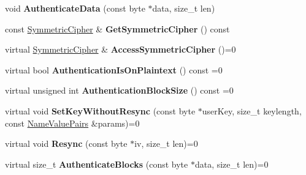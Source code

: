 \begin{DoxyCompactItemize}
\item 
\hypertarget{class_authenticated_symmetric_cipher_base_a7301940acbeb15766869f0cd34d38ccc}{
void {\bfseries AuthenticateData} (const byte $\ast$data, size\_\-t len)}
\label{class_authenticated_symmetric_cipher_base_a7301940acbeb15766869f0cd34d38ccc}

\item 
\hypertarget{class_authenticated_symmetric_cipher_base_afbb278c9474c59cb2432230d51808e1d}{
const \hyperlink{class_symmetric_cipher}{SymmetricCipher} \& {\bfseries GetSymmetricCipher} () const }
\label{class_authenticated_symmetric_cipher_base_afbb278c9474c59cb2432230d51808e1d}

\item 
\hypertarget{class_authenticated_symmetric_cipher_base_a3ce66816441895342dc3a7ca9f40fbb8}{
virtual \hyperlink{class_symmetric_cipher}{SymmetricCipher} \& {\bfseries AccessSymmetricCipher} ()=0}
\label{class_authenticated_symmetric_cipher_base_a3ce66816441895342dc3a7ca9f40fbb8}

\item 
\hypertarget{class_authenticated_symmetric_cipher_base_a6f73519e6de98c487592e89df1673f30}{
virtual bool {\bfseries AuthenticationIsOnPlaintext} () const =0}
\label{class_authenticated_symmetric_cipher_base_a6f73519e6de98c487592e89df1673f30}

\item 
\hypertarget{class_authenticated_symmetric_cipher_base_a22214f198aa9cd58878eb1ba72698091}{
virtual unsigned int {\bfseries AuthenticationBlockSize} () const =0}
\label{class_authenticated_symmetric_cipher_base_a22214f198aa9cd58878eb1ba72698091}

\item 
\hypertarget{class_authenticated_symmetric_cipher_base_aa4bf2de3e27ecb93fac981ea84b64cbe}{
virtual void {\bfseries SetKeyWithoutResync} (const byte $\ast$userKey, size\_\-t keylength, const \hyperlink{class_name_value_pairs}{NameValuePairs} \&params)=0}
\label{class_authenticated_symmetric_cipher_base_aa4bf2de3e27ecb93fac981ea84b64cbe}

\item 
\hypertarget{class_authenticated_symmetric_cipher_base_a20221bcfa8c65825968ada3f4b7df8d6}{
virtual void {\bfseries Resync} (const byte $\ast$iv, size\_\-t len)=0}
\label{class_authenticated_symmetric_cipher_base_a20221bcfa8c65825968ada3f4b7df8d6}

\item 
\hypertarget{class_authenticated_symmetric_cipher_base_a2e198c063a67692210b1578d293a8df5}{
virtual size\_\-t {\bfseries AuthenticateBlocks} (const byte $\ast$data, size\_\-t len)=0}
\label{class_authenticated_symmetric_cipher_base_a2e198c063a67692210b1578d293a8df5}


\end{DoxyCompactItemize}
